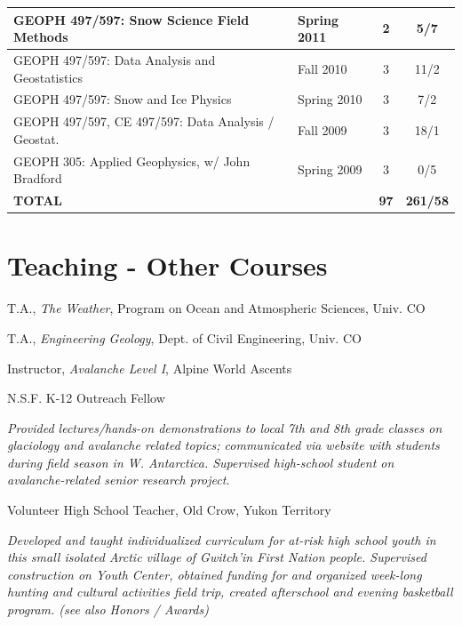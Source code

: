 \documentclass[11pt]{article}
\renewenvironment{itemize}{
  \begin{list}{}{
    \setlength{\leftmargin}{1.5em}
    \setlength{\itemsep}{0pt}
    \setlength{\parskip}{0pt}
  }
}{
  \end{list}
}
\begin{document}
\begin{table}[!htbp]
\begin{tabular}{|l|l|c|c|}
GEOPH 497/597: Snow Science Field Methods & Spring 2011 & 2 & 5/7 \\ \hline
GEOPH 497/597: Data Analysis and Geostatistics & Fall 2010 & 3 & 11/2 \\ \hline
GEOPH 497/597: Snow and Ice Physics & Spring 2010 & 3 & 7/2 \\ \hline
GEOPH 497/597, CE 497/597: Data Analysis / Geostat. & Fall 2009 & 3 & 18/1  \\ \hline
GEOPH 305: Applied Geophysics, w/ John Bradford & Spring 2009 & 3 & 0/5 \\ \hline
\textbf{TOTAL} &  & \textbf{97} & \textbf{261/58} \\ \hline
\end{tabular}
\end{table}


\section*{Teaching - Other Courses}
\begin{itemize}
\item[01/2003-06/2003] T.A., \textit{The Weather}, Program on Ocean and Atmospheric Sciences, Univ. CO
\item[01/2000-06/2000] T.A., \textit{Engineering Geology}, Dept. of Civil Engineering, Univ. CO
\item[12/2002-12/2003] Instructor, \textit{Avalanche Level I}, Alpine World Ascents
\item[08/2001-06/2002] N.S.F. K-12 Outreach Fellow
\item \textit{Provided lectures/hands-on demonstrations to local 7th and 8th grade 
classes on glaciology and avalanche related topics; communicated via website with students 
during field season in W. Antarctica. Supervised high-school student on avalanche-related 
senior research project.}

\item[09/1999-03/2000] Volunteer High School Teacher, Old Crow, Yukon Territory
\item \textit{Developed and taught individualized curriculum for at-risk high school youth in this 
small isolated Arctic village of Gwitch'in First Nation people.  Supervised construction 
on Youth Center, obtained funding for and organized week-long hunting and cultural 
activities field trip, created afterschool and evening basketball program. (see also Honors 
/ Awards)}
\end{itemize}
\end{document}
